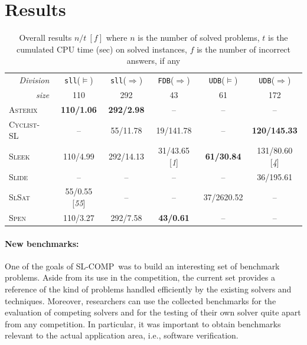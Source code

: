 \documentclass[twoside,11pt]{article}
\newcommand{\limp}{\Rightarrow}
\newcommand{\sllsat}{\texttt{sll}($\models$)}
\newcommand{\sllent}{\texttt{sll}($\limp$)}
\newcommand{\FDBent}{\texttt{FDB}($\limp$)}
\newcommand{\UDBsat}{\texttt{UDB}($\models$)}
\newcommand{\UDBent}{\texttt{UDB}($\limp$)}
\newcommand{\ASTERIX}{\textsc{Asterix}}
\newcommand{\CYCLIST}{\textsc{Cyclist-SL}}
\newcommand{\SLEEK}{\textsc{Sleek}}
\newcommand{\SLIDE}{\textsc{Slide}}
\newcommand{\SLSAT}{\textsc{SlSat}}
\newcommand{\SPEN}{\textsc{Spen}}
\newcommand{\slcomp}{\textsf{SL-COMP}}
\begin{document}
\section{Results}

\begin{table}
\caption{%
Overall results $n/t~[f]$ where %
$n$ is the number of solved problems,  %
$t$ is the cumulated CPU time (sec) on solved instances, %
$f$ is the number of incorrect answers, if any %
}
\label{tab:overall}
\vspace{-3eX}
\begin{center}
\begin{tabular}{l*{5}c}\hline
\multicolumn{1}{r}{\emph{Division}} & \sllsat & \sllent & \FDBent & \UDBsat & \UDBent \\
\multicolumn{1}{r}{\emph{size}} & 110 & 292 & 43 & 61 & 172 \\
\hline
\ASTERIX &
\textbf{110/1.06} &  %
\textbf{292/2.98} &  %
-- &
-- &
--
\\\hline
\CYCLIST &
-- &
55/11.78 & %
19/141.78 & %
-- &
\textbf{120/145.33} %
\\\hline
\SLEEK &
110/4.99 & %
292/14.13 & %
31/43.65 [\emph{1}] & %
\textbf{61/30.84} & %
131/80.60 [\emph{4}] %
\\\hline
\SLIDE &
-- &
-- &
-- &
-- &
36/195.61 %
\\\hline
\SLSAT &
55/0.55 [\emph{55}] & %
--  &
--  &
37/2620.52 & %
--
\\\hline
\SPEN &
110/3.27 & %
292/7.58 & %
\textbf{43/0.61} & %
-- &
--
\\\hline
\end{tabular}
\end{center}
\end{table}


\paragraph{New benchmarks:}
One of the goals of \slcomp\ was to build an interesting set of benchmark problems. 
Aside from its use in the competition, the current set provides a reference of the kind of problems handled efficiently by the existing solvers and techniques.
Moreover, researchers can use the collected benchmarks for the evaluation of competing solvers and for the testing of their own solver quite apart from any competition. 
In particular, it was important to obtain benchmarks relevant to the actual application area, i.e., software verification.
\end{document}
